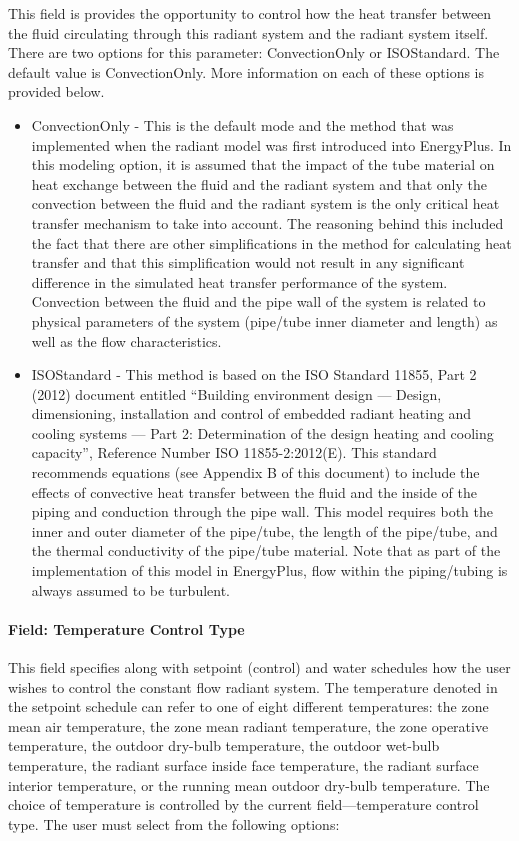 This field is provides the opportunity to control how the heat transfer between the fluid circulating through this radiant system and the radiant system itself.  There are two options for this parameter: ConvectionOnly or ISOStandard.  The default value is ConvectionOnly.  More information on each of these options is provided below.

\begin{itemize}
	\item
	ConvectionOnly - This is the default mode and the method that was implemented when the radiant model was first introduced into EnergyPlus.  In this modeling option, it is assumed that the impact of the tube material on heat exchange between the fluid and the radiant system and that only the convection between the fluid and the radiant system is the only critical heat transfer mechanism to take into account.  The reasoning behind this included the fact that there are other simplifications in the method for calculating heat transfer and that this simplification would not result in any significant difference in the simulated heat transfer performance of the system.  Convection between the fluid and the pipe wall of the system is related to physical parameters of the system (pipe/tube inner diameter and length) as well as the flow characteristics.
	\item
	ISOStandard - This method is based on the ISO Standard 11855, Part 2 (2012) document entitled ``Building environment design — Design, dimensioning, installation and control of embedded radiant heating and cooling systems — Part 2: Determination of the design heating and cooling capacity'', Reference Number ISO 11855-2:2012(E).  This standard recommends equations (see Appendix B of this document) to include the effects of convective heat transfer between the fluid and the inside of the piping and conduction through the pipe wall.  This model requires both the inner and outer diameter of the pipe/tube, the length of the pipe/tube, and the thermal conductivity of the pipe/tube material.  Note that as part of the implementation of this model in EnergyPlus, flow within the piping/tubing is always assumed to be turbulent.
\end{itemize}

\paragraph{Field: Temperature Control Type}\label{field-temperature-control-type-1}

This field specifies along with setpoint (control) and water schedules how the user wishes to control the constant flow radiant system. The temperature denoted in the setpoint schedule can refer to one of eight different temperatures: the zone mean air temperature, the zone mean radiant temperature, the zone operative temperature, the outdoor dry-bulb temperature, the outdoor wet-bulb temperature, the radiant surface inside face temperature, the radiant surface interior temperature, or the running mean outdoor dry-bulb temperature. The choice of temperature is controlled by the current field---temperature control type. The user must select from the following options:

